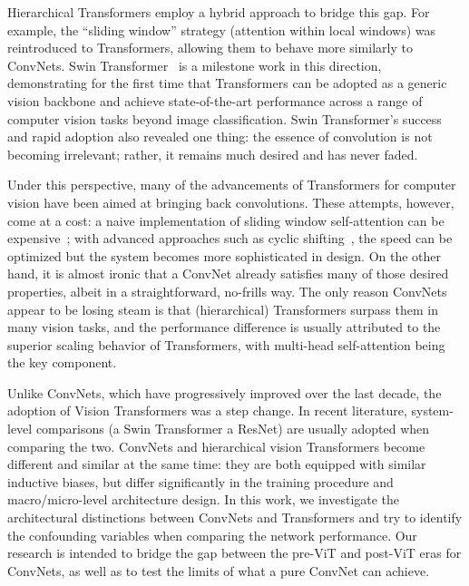 \documentclass[10pt,twocolumn,letterpaper]{article}
\begin{document}
Hierarchical Transformers employ a hybrid approach to bridge this gap. For example, the ``sliding window'' strategy (\eg attention within local windows) was reintroduced to Transformers, allowing them to behave more similarly to ConvNets. Swin Transformer~\cite{Liu2021swin} is a milestone work in this direction, demonstrating for the first time that Transformers can be adopted as a generic vision backbone and achieve state-of-the-art performance across a range of computer vision tasks beyond image classification. Swin Transformer's success and rapid adoption also revealed one thing: the essence of convolution is not becoming irrelevant; rather, it remains much desired and has never faded. 


Under this perspective, many of the advancements of Transformers for computer vision have been aimed at bringing back convolutions. These attempts, however, come at a cost: a naive implementation of sliding window self-attention can be expensive~\cite{ramachandran2019stand}; with advanced approaches such as cyclic shifting~\cite{Liu2021swin}, the speed can be optimized but the system becomes more sophisticated in design. 
On the other hand, it is almost ironic that a ConvNet already satisfies many of those desired properties, albeit in a straightforward, no-frills way. The only reason ConvNets appear to be losing steam is that (hierarchical) Transformers surpass them in many vision tasks, and the performance difference is usually attributed to the superior scaling behavior of Transformers, with multi-head self-attention being the key component. 

Unlike ConvNets, which have progressively improved over the last decade, the adoption of Vision Transformers was a step change. In recent literature, system-level comparisons (\eg a Swin Transformer \vs a ResNet) are usually adopted when comparing the two. ConvNets and hierarchical vision Transformers become different and similar at the same time: they are both equipped with similar inductive biases, but differ significantly in the training procedure and macro/micro-level architecture design. 
In this work, 
we investigate the architectural distinctions between ConvNets and Transformers and try to identify the confounding variables when comparing the network performance.
Our research is intended to bridge the gap between the pre-ViT and post-ViT eras for ConvNets, as well as to test the limits of what a pure ConvNet can achieve. 
\end{document}
